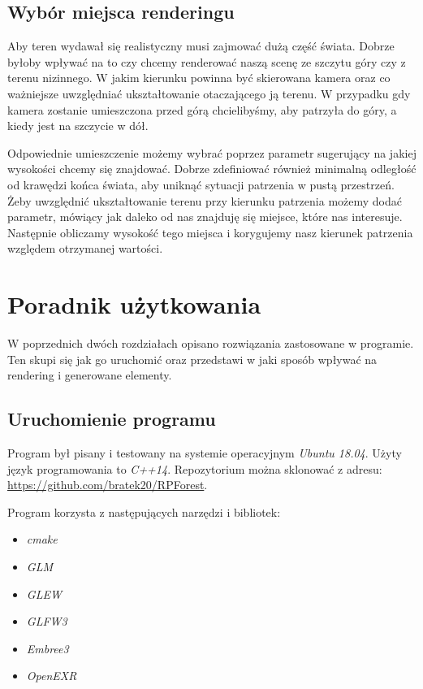 \documentclass[inz,shortabstract]{iithesis}
\begin{document}
    \section{Wybór miejsca renderingu}
        Aby teren wydawał się realistyczny musi zajmować dużą część świata. Dobrze byłoby wpływać na to czy chcemy renderować naszą scenę ze szczytu góry czy z terenu nizinnego. W jakim kierunku powinna być skierowana kamera oraz co ważniejsze uwzględniać ukształtowanie otaczającego ją terenu. W przypadku gdy kamera zostanie umieszczona przed górą chcielibyśmy, aby patrzyła do góry, a kiedy jest na szczycie w dół. 
        
        Odpowiednie umieszczenie możemy wybrać poprzez parametr sugerujący na jakiej wysokości chcemy się znajdować. Dobrze zdefiniować również minimalną odległość od krawędzi końca świata, aby uniknąć sytuacji patrzenia w pustą przestrzeń. Żeby uwzględnić ukształtowanie terenu przy kierunku patrzenia możemy dodać parametr, mówiący jak daleko od nas znajduję się miejsce, które nas interesuje. Następnie obliczamy wysokość tego miejsca i korygujemy nasz kierunek patrzenia względem otrzymanej wartości.
        
\chapter{Poradnik użytkowania}
    W poprzednich dwóch rozdziałach opisano rozwiązania zastosowane w programie. Ten skupi się jak go uruchomić oraz przedstawi w jaki sposób wpływać na rendering i generowane elementy.
    
    \section{Uruchomienie programu}
        Program był pisany i testowany na systemie operacyjnym \textit{Ubuntu 18.04}. Użyty język programowania to \textit{C++14}.
        Repozytorium można sklonować z adresu: \url{https://github.com/bratek20/RPForest}.
        
        Program korzysta z następujących narzędzi i bibliotek:
        \begin{itemize}
            \item \textit{cmake}
            \item \textit{GLM}
            \item \textit{GLEW}
            \item \textit{GLFW3}
            \item \textit{Embree3}
            \item \textit{OpenEXR}
        \end{itemize}
\end{document}
